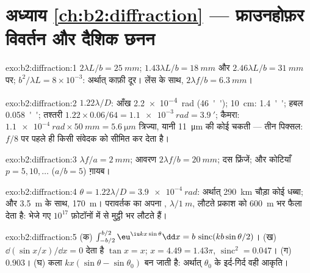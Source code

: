 \section*{अध्याय \ref{ch:b2:diffraction} --- फ्राउनहोफ़र विवर्तन और दैशिक छनन}

\begin{solution}{exo:b2:diffraction:1}
$2\lambda L/b = \qty{25}{mm}$;  $1.43\lambda L/b = \qty{18}{mm}$ और
$2.46\lambda L/b = \qty{31}{mm}$ पर;  $b^2/\lambda L = 8 \times 10^{-3}$: अर्थात् काफ़ी
दूर। लेंस के साथ, $2\lambda f/b = \qty{6.3}{mm}$।
\end{solution}

\begin{solution}{exo:b2:diffraction:2}
$1.22\lambda/D$: आँख \qty{2.2e-4}{rad} (\qty{46}{''}); \qty{10}{cm}: \qty{1.4}{''}; हबल
\qty{0.058}{''}; तश्तरी $1.22 \times 0.06/64 = \qty{1.1e-3}{rad} = \qty{3.9}{'}$; कैमरा:
$\qty{1.1e-4}{rad} \times \qty{50}{mm} = \qty{5.6}{\micro m}$ त्रिज्या, यानी \qty{11}{\micro m} की कोई चकती ---
तीन पिक्सल: $f/8$ पर  पहले ही किसी संवेदक को सीमित कर देता है।
\end{solution}

\begin{solution}{exo:b2:diffraction:3}
$\lambda f/a = \qty{2}{mm}$; आवरण $2\lambda f/b = \qty{20}{mm}$; दस फ्रिंजें; और कोटियाँ
$p = 5, 10, \dots$ ($a/b = 5$) ग़ायब।
\end{solution}

\begin{solution}{exo:b2:diffraction:4}
$\theta = 1.22\lambda/D = \qty{3.9e-4}{rad}$: अर्थात् \qty{290}{km} चौड़ा कोई धब्बा; और \qty{3.5}{m} के साथ,
\qty{170}{m}। परावर्तक का अपना , $\lambda/\qty{1}{m}$, लौटते प्रकाश को
\qty{600}{m} भर फैला देता है: भेजे गए $10^{17}$ फ़ोटॉनों में से मुट्ठी भर लौटते हैं।
\end{solution}

\begin{solution}{exo:b2:diffraction:5}
(क) $\int_{-b/2}^{b/2}\eu^{\iu kx\sin\theta}\dd x = b\,\operatorname{sinc}(kb\sin\theta/2)$। (ख)
$\dd(\sin x/x)/\dd x = 0$ देता है $\tan x = x$; $x = 4.49 = 1.43\pi$, $\operatorname{sinc}^2 =
0.047$। (ग) $0.903$। (घ) कला $kx(\sin\theta - \sin\theta_0)$ बन जाती है: अर्थात्
$\theta_0$ के इर्द-गिर्द वही आकृति।
\end{solution}

